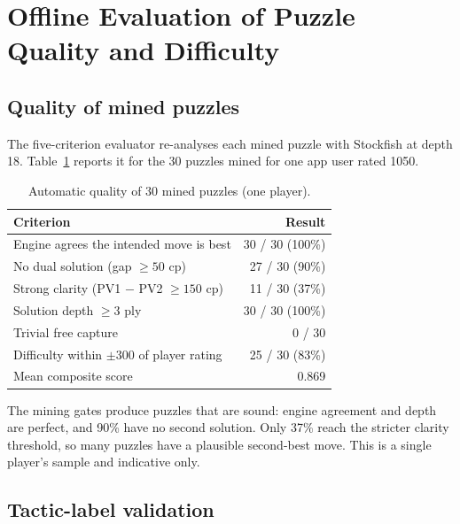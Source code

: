 \section{Offline Evaluation of Puzzle Quality and Difficulty}

\subsection{Quality of mined puzzles}

The five-criterion evaluator re-analyses each mined puzzle with Stockfish at depth 18.
Table~\ref{tab:quality} reports it for the 30 puzzles mined for one app user rated 1050.

\begin{table}[H]
\centering
\small
\caption{Automatic quality of 30 mined puzzles (one player).}\label{tab:quality}
\begin{tabular}{lr}
\toprule
\textbf{Criterion} & \textbf{Result} \\
\midrule
Engine agrees the intended move is best & 30 / 30 (100\%) \\
No dual solution (gap $\geq 50$ cp) & 27 / 30 (90\%) \\
Strong clarity (PV1 $-$ PV2 $\geq 150$ cp) & 11 / 30 (37\%) \\
Solution depth $\geq 3$ ply & 30 / 30 (100\%) \\
Trivial free capture & 0 / 30 \\
Difficulty within $\pm 300$ of player rating & 25 / 30 (83\%) \\
Mean composite score & 0.869 \\
\bottomrule
\end{tabular}
\end{table}

The mining gates produce puzzles that are sound: engine agreement and depth are perfect, and 90\% have
no second solution. Only 37\% reach the stricter clarity threshold, so many puzzles have a plausible
second-best move. This is a single player's sample and indicative only.

\subsection{Tactic-label validation}\label{sec:labeller-results}


